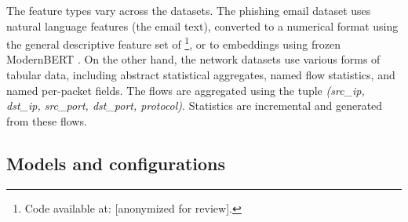 \documentclass{jmlr}
\begin{document}
The feature types vary across the datasets. The phishing email dataset uses natural language features (the email text), converted to a numerical format using the general descriptive feature set of \citet{cohen2018email}\footnote{Code available at: [anonymized for review].}, or to embeddings using frozen ModernBERT \citep{warner2024modernbert}. On the other hand, the network datasets use various forms of tabular data, including abstract statistical aggregates, named flow statistics, and named per-packet fields. The flows are aggregated using the tuple \textit{(src\_ip, dst\_ip, src\_port, dst\_port, protocol)}. Statistics are incremental and generated from these flows.

\subsection{Models and configurations}
\label{sec:models-and-training}
\end{document}
